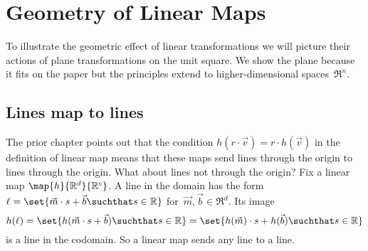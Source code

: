 \chapter{Geometry of Linear Maps}

To illustrate the geometric effect of linear transformations 
we will picture their actions 
of plane transformations on the unit square.
We show the plane 
because it fits on the paper but the principles extend to 
higher-dimensional spaces~$\Re^n$.




\section{Lines map to lines}
The prior chapter points out that 
the condition $h(r\cdot \vec{v})=r\cdot h(\vec{v})$ in the definition
of linear map means that
these maps send lines through the origin to lines through the origin.
What about lines not through the origin?
Fix a linear map $\map{h}{\Re^d}{\Re^c}$.
A line in the domain has the form 
$\ell = \set{\vec{m}\cdot s +\vec{b}\suchthat s\in\Re}$
for~$\vec{m}, \vec{b}\in\Re^d$.
Its image
\begin{equation*}
  h(\ell)=\set{h(\vec{m}\cdot s+\vec{b})\suchthat s\in\Re}
  =\set{h(\vec{m})\cdot s+h(\vec{b})\suchthat s\in\Re}
\end{equation*}
is a line in the codomain.
So a linear map sends any line to a line. 

